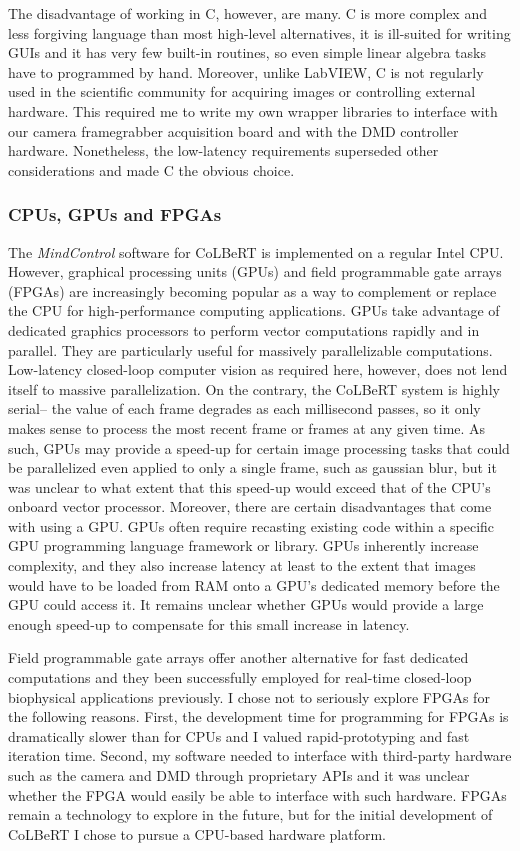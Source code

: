 The disadvantage of working in C, however, are many. C is more complex and less forgiving language than most high-level alternatives, it is ill-suited for writing GUIs and it has very few built-in routines, so even simple linear algebra tasks have to programmed by hand. Moreover, unlike LabVIEW, C is not regularly used in the scientific community for acquiring images or controlling external hardware. This required me to write my own wrapper libraries to interface with our camera framegrabber acquisition board and with the DMD controller hardware. Nonetheless, the low-latency requirements superseded other considerations and made C the obvious choice. 

\subsubsection{CPUs, GPUs and FPGAs}
The \emph{MindControl} software for CoLBeRT is implemented on a regular Intel CPU. However, graphical processing units (GPUs) and field programmable gate arrays (FPGAs) are increasingly becoming popular as a way to complement or replace the CPU for high-performance computing applications.  GPUs take advantage of dedicated graphics processors to perform vector computations rapidly and in parallel. They are particularly useful for massively parallelizable computations. Low-latency closed-loop computer vision as required here, however, does not lend itself to massive parallelization. On the contrary, the CoLBeRT system is highly serial-- the value of each frame degrades as each millisecond passes, so it only makes sense to process the most recent frame or frames at any given time. As such, GPUs may  provide a speed-up for certain image processing tasks that could be parallelized even  applied to only a single frame, such as gaussian blur, but it was unclear to what extent that this speed-up would exceed that of the CPU's onboard vector processor. Moreover, there are certain disadvantages that come with using a GPU. GPUs often require recasting existing code within a specific GPU programming language framework or library. GPUs inherently increase complexity, and they also increase latency at least to the extent that images would have to be loaded from RAM onto a GPU's dedicated memory before the  GPU could access it. It remains unclear whether GPUs would provide a large enough speed-up to compensate for this small increase in latency.

Field programmable gate arrays offer another alternative for fast dedicated computations and they been successfully employed for real-time closed-loop biophysical applications  previously\citep{fields_electrokinetic_2011}. I chose not to seriously explore FPGAs for the following reasons. First, the development time for programming for FPGAs is dramatically slower than for CPUs and I valued rapid-prototyping and fast iteration time. Second, my software needed to interface with third-party hardware such as the camera and DMD through proprietary APIs and it was unclear whether the FPGA would easily be able to interface with such hardware. FPGAs remain a technology to explore in the future, but for the initial development of CoLBeRT I chose to pursue a CPU-based hardware platform.   

